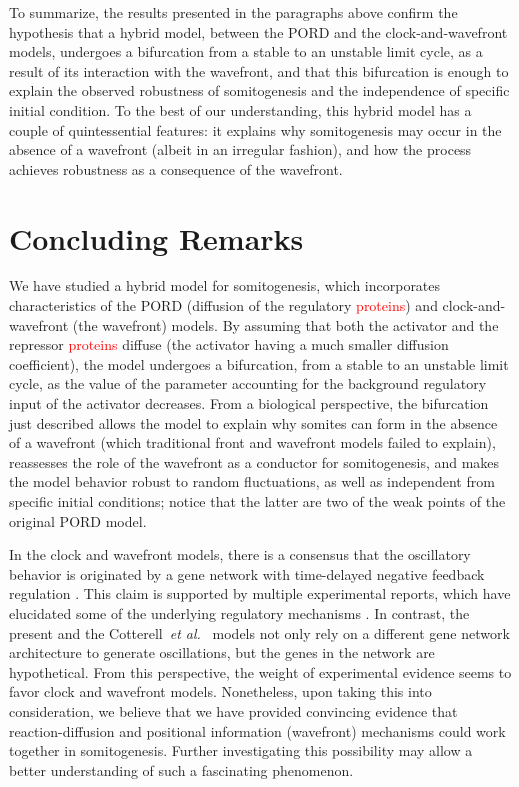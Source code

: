 \documentclass[%
 preprint,
 aip, 
 amsmath,amssymb,
]{revtex4-2}
\begin{document}
	To summarize, the results presented in the paragraphs above confirm the
	hypothesis that a hybrid model, between the PORD and the clock-and-wavefront 
	models, undergoes a bifurcation from a stable to an 
	unstable limit cycle, as a result of its interaction with the
	wavefront, and
	that this bifurcation is enough to explain the observed robustness of
	somitogenesis and the independence of specific initial condition. 
	To the best of our understanding, this hybrid model has
	a couple of quintessential features: it explains why somitogenesis may occur in the 
	absence of a wavefront (albeit in an irregular fashion), and how the process 
	achieves robustness as a consequence of the wavefront.
	
	
	\section{Concluding Remarks}
	\label{conclu}
	
	We have studied a hybrid model for somitogenesis, which incorporates characteristics of the PORD (diffusion of the regulatory \textcolor{red}{proteins}) and clock-and-wavefront (the wavefront) models. By assuming that both the activator and the repressor \textcolor{red}{proteins} diffuse (the activator having a much smaller diffusion coefficient), the model undergoes a bifurcation, from a stable to an unstable limit cycle, as the value of the parameter accounting for the background regulatory input of the activator decreases. From a biological perspective, the bifurcation just described allows the model to explain why somites can form in the absence of a wavefront (which traditional front and wavefront models failed to explain), reassesses the role of the wavefront as a conductor for somitogenesis, and makes the model behavior robust to random fluctuations, as  well as independent from specific initial conditions; notice that the latter are two of the weak points of the original PORD model.  
	
	In the clock and wavefront models, there is a consensus that the oscillatory behavior is originated by a gene network with time-delayed negative feedback regulation \cite{Monk2003, Lewis2003}. This claim is supported by multiple experimental reports, which have elucidated some of the underlying regulatory mechanisms \cite{Schroter2012}. In contrast, the present and the Cotterell~{\em et al.}~\cite{Cotterell2015} models not only rely on a different gene network architecture to generate oscillations, but the genes in the network are hypothetical. From this perspective, the weight of experimental evidence seems to favor clock and wavefront models. Nonetheless, upon taking this into consideration, we believe that we have provided convincing evidence that reaction-diffusion and positional information (wavefront) mechanisms could work together in somitogenesis. Further investigating this possibility may allow a better understanding of such a fascinating phenomenon.
	
\end{document}
